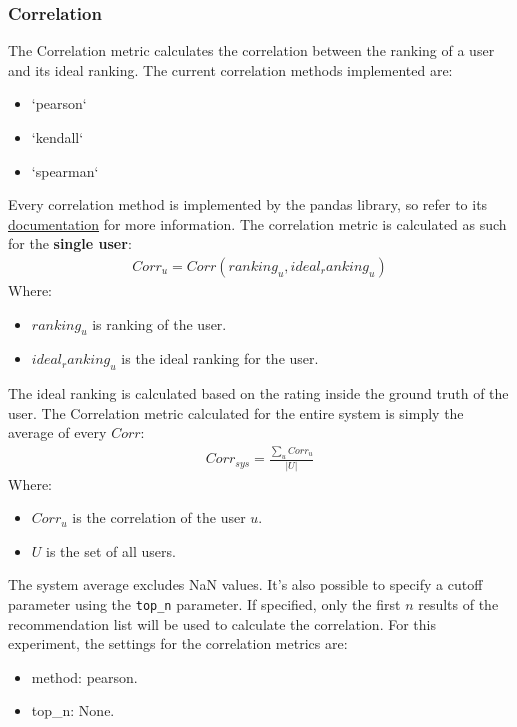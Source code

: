 \documentclass[11pt]{article}
\begin{document}
\subsubsection{Correlation}\label{subsubsec:corr}
The Correlation metric calculates the correlation between the ranking of a user and its ideal ranking.
The current correlation methods implemented are:
\begin{itemize}
    \item `pearson`
    \item `kendall`
    \item `spearman`
\end{itemize}
\hfill\break
\hfill\break
Every correlation method is implemented by the pandas library, so refer to its
\href{https://pandas.pydata.org/docs/reference/api/pandas.Series.corr.html}{documentation} for more information.
\hfill\break
\hfill\break
The correlation metric is calculated as such for the \textbf{single user}:
\hfill\break
\hfill\break
    \[
      \begin{gathered}
          Corr_u = Corr(ranking_u, ideal_ranking_u)
      \end{gathered}
    \]
\hfill\break
\hfill\break
    Where:
\begin{itemize}
    \item $ranking_u$ is ranking of the user.
    \item $ideal_ranking_u$ is the ideal ranking for the user.
\end{itemize}
\hfill\break
\hfill\break
The ideal ranking is calculated based on the rating inside the ground truth of the user.
The Correlation metric calculated for the entire system is simply the average of every $Corr$:
\hfill\break
\hfill\break
    \[
      \begin{gathered}
          Corr_{sys} = \frac{\sum_{u} Corr_u}{|U|}
      \end{gathered}
    \]
\hfill\break
\hfill\break
    Where:
\begin{itemize}
    \item $Corr_u$ is the correlation of the user $u$.
    \item $U$ is the set of all users.
\end{itemize}
\hfill\break
\hfill\break
The system average excludes NaN values.
It's also possible to specify a cutoff parameter using the \texttt{top\_n} parameter.
If specified, only the first $n$ results of the recommendation list will be used to calculate the correlation.
For this experiment, the settings for the correlation metrics are:
\begin{itemize}
    \item method: pearson.
    \item top\_n: None.
\end{itemize}
\hfill\break
\hfill\break
\end{document}

